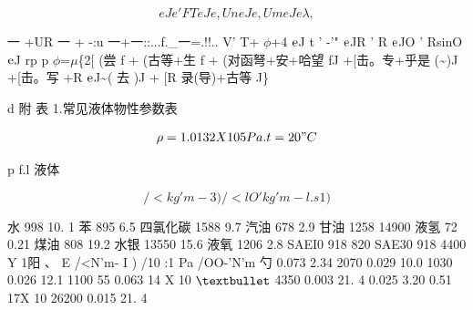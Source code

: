 \[eJe 'FT eJe , Un eJe , Um eJ e \lambda  , \]

一 +UR 一 + -:u 一+一::...f.\_一=.!!.. V' T+ $\phi$+4 ${\rm e}$J t ' -'" ${\rm e}$JR ' R ${\rm e}$JO ' RsinO ${\rm e}$J rp p $\phi$=$\mu$\{2[ (尝 f + (古等+生 f + (对函弩+安+哈望 fJ +[击。专+乎是 (\textasciitilde{})J +[击。写 +R ${\rm e}$J\textasciitilde{}( 去 )J + [R 录(导)+古等 J\}

d 附 表 1.常见液体物性参数表

\[\rho = 1. 0132 X 105 Pa.t= 20"C\]

p f.l 液体

\[/<kg' m- 3) /<l O'kg'm-l.s 1)\]

水 998 10. 1 苯 895 6.5 四氯化碳 1588 9.7 汽油 678 2.9 甘油 1258 14900 液氢 72 0.21 煤油 808 19.2 水银 13550 15.6 液氧 1206 2.8 SAEI0 918 820 SAE30 918 4400 Y 1阳 、 E /<N'm- I ) /10 :1 Pa /OO-'N'm 勺 0.073 2.34 2070 0.029 10.0 1030 0.026 12.1 1100 55 0.063 14 X 10 ${\rm •}$ 4350 0.003 21. 4 0.025 3.20 0.51 17X 10 26200 0.015 21. 4
